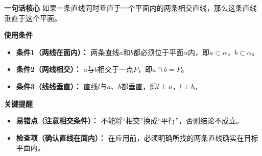 \begin{summarybox}
	\textbf{\textcolor{CSummary}{一句话核心}}
	如果一条直线同时垂直于一个平面内的两条相交直线，那么这条直线垂直于这个平面。

	\medskip
	\textbf{\textcolor{CSummary}{使用条件}}
	\begin{itemize}[leftmargin=*, itemsep=0.5em, topsep=0.4em]
		\item \textbf{条件1（两线在面内）：} 两条直线$a$和$b$都必须位于平面$\alpha$内，即$a\subset\alpha$，$b\subset\alpha$。
		\item \textbf{条件2（两线相交）：} $a$与$b$相交于一点$P$，即$a\cap b=P$。
		\item \textbf{条件3（线线垂直）：} 直线$l$与$a$、$b$都垂直，即$l\perp a$，$l\perp b$。
	\end{itemize}

	\medskip
	\textbf{\textcolor{CSummary}{关键提醒}}
	\begin{itemize}[leftmargin=*, itemsep=0.5em, topsep=0.4em]
		\item \textbf{易错点（注意相交条件）：} 不能将“相交”换成“平行”，否则结论不成立。
		\item \textbf{检查项（确认直线在面内）：} 在应用前，必须明确所找的两条直线确实在目标平面内。
	\end{itemize}

\end{summarybox}
